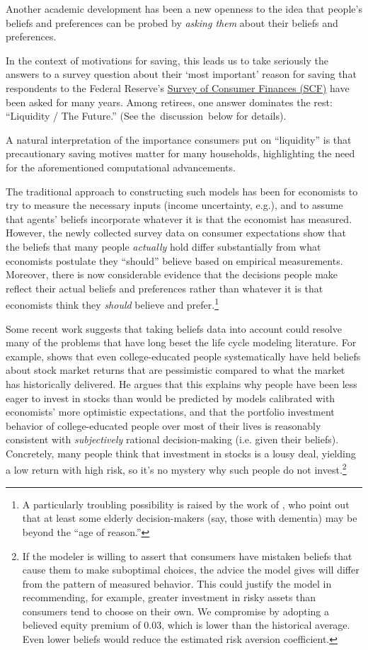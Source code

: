 \documentclass{article}
\begin{document}
Another academic development has been a new openness to the idea that people's beliefs and preferences can be probed by \textit{asking them} about their beliefs and preferences.

In the context of motivations for saving, this leads us to take seriously the answers to a survey question about their `most important' reason for saving that respondents to the Federal Reserve's \href{https://www.federalreserve.gov/econres/scfindex.htm}{Survey of Consumer Finances (SCF)} have been asked for many years.
Among retirees, one answer dominates the rest: ``Liquidity / The Future.''  (See the~discussion~below for details).

A natural interpretation of the importance consumers put on ``liquidity'' is that precautionary saving motives matter for many households, highlighting the need for the aforementioned computational advancements.

The traditional approach to constructing such models has been for economists to try to measure the necessary inputs (income uncertainty, e.g.), and to assume that agents' beliefs incorporate whatever it is that the economist has measured.
However, the newly collected survey data on consumer expectations show that the beliefs that many people \textit{actually} hold differ substantially from what economists postulate they ``should'' believe based on empirical measurements.
Moreover, there is now considerable evidence that the decisions people make reflect their actual beliefs and preferences rather than whatever it is that economists think they \textit{should} believe and prefer.\footnote{A particularly troubling possibility is raised by the work of \cite{gabaix2010age}, who point out that at least some elderly decision-makers (say, those with dementia) may be beyond the ``age of reason.''}

Some recent work suggests that taking beliefs data into account could resolve many of the problems that have long beset the life cycle modeling literature.
For example, \cite{velasquezgiraldoJMP} shows that even college-educated people systematically have held beliefs about stock market returns that are pessimistic compared to what the market has historically delivered.
He argues that this explains why people have been less eager to invest in stocks than would be predicted by models calibrated with economists' more optimistic expectations, and that the portfolio investment behavior of college-educated people over most of their lives is reasonably consistent with \textit{subjectively} rational decision-making (i.e. given their beliefs).
Concretely, many people think that investment in stocks is a lousy deal, yielding a low return with high risk, so it's no mystery why such people do not invest.\footnote{If the modeler is willing to assert that consumers have mistaken beliefs that cause them to make suboptimal choices, the advice the model gives will differ from the pattern of measured behavior. This could justify the model in recommending, for example, greater investment in risky assets than consumers tend to choose on their own. We compromise by adopting a believed equity premium of 0.03, which is lower than the historical average. Even lower beliefs would reduce the estimated risk aversion coefficient.}
\end{document}
